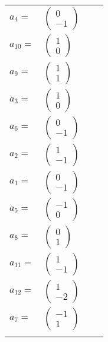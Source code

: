\documentclass[1p]{elsarticle_modified}
\theoremstyle{definition}
\begin{document}
\begin{tabular}{m{7pt} m{180pt} m{7pt} m{180pt} }
\flushright $a_{4}=$&$\begin{pmatrix}0\\-1\end{pmatrix}$ \\
\flushright $a_{10}=$&$\begin{pmatrix}1\\0\end{pmatrix}$ \\
\flushright $a_{9}=$&$\begin{pmatrix}1\\1\end{pmatrix}$ \\
\flushright $a_{3}=$&$\begin{pmatrix}1\\0\end{pmatrix}$ \\
\flushright $a_{6}=$&$\begin{pmatrix}0\\-1\end{pmatrix}$ \\
\flushright $a_{2}=$&$\begin{pmatrix}1\\-1\end{pmatrix}$ \\
\flushright $a_{1}=$&$\begin{pmatrix}0\\-1\end{pmatrix}$ \\
\flushright $a_{5}=$&$\begin{pmatrix}-1\\0\end{pmatrix}$ \\
\flushright $a_{8}=$&$\begin{pmatrix}0\\1\end{pmatrix}$ \\
\flushright $a_{11}=$&$\begin{pmatrix}1\\-1\end{pmatrix}$ \\
\flushright $a_{12}=$&$\begin{pmatrix}1\\-2\end{pmatrix}$ \\
\flushright $a_{7}=$&$\begin{pmatrix}-1\\1\end{pmatrix}$\\&\end{tabular}
\end{document}
